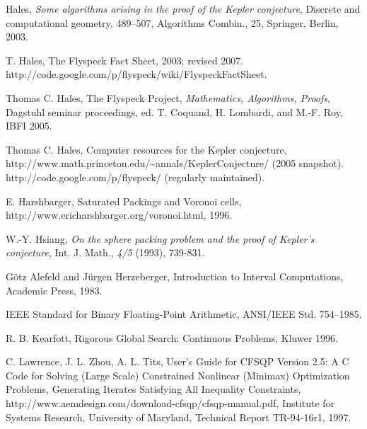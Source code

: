\documentclass{article} %
\begin{document}
\begin{thebibliography}{HeHa94}
 Hales, {\it Some algorithms arising in the proof of the
	Kepler conjecture}, 
	Discrete and computational
geometry, 489--507, Algorithms Combin., 25, Springer, Berlin,
2003.
	
	   T. Hales, The Flyspeck Fact Sheet, 2003; revised
2007. http://code.google.com/p/flyspeck/wiki/FlyspeckFactSheet.
	
	  Thomas C. Hales, The Flyspeck Project, 
{\it Mathematics, Algorithms, Proofs}, Dagstuhl seminar proceedings, 
ed. T. Coquand, H. Lombardi, and M.-F. Roy,
IBFI 2005.
	






 Thomas C. Hales, Computer resources for the Kepler conjecture, \hfill\break
    http://www.math.princeton.edu/\~\!annals/KeplerConjecture/ (2005 snapshot).
    http://code.google.com/p/flyspeck/ (regularly maintained).
    
 E. Harshbarger, Saturated Packings and Voronoi cells, http://www.ericharshbarger.org/voronoi.html, 1996.

 W.-Y. Hsiang, {\it On the sphere packing problem and
the proof of Kepler's conjecture}, Int. J. Math., \emph{4/5} (1993),
739-831.

 G\"otz Alefeld and J\"urgen Herzeberger,
Introduction to Interval Computations, Academic Press, 1983.


 IEEE Standard for Binary Floating-Point Arithmetic,
ANSI/IEEE Std. 754--1985.

 R. B. Kearfott, Rigorous Global Search: Continuous
Problems, Kluwer 1996.

 C. Lawrence, J. L. Zhou, A. L. Tits,  User's Guide for CFSQP Version 2.5:
   A C Code for Solving (Large Scale) Constrained Nonlinear (Minimax) Optimization Problems, Generating
   Iterates Satisfying All Inequality Constraints, 
   http://www.aemdesign.com/download-cfsqp/cfsqp-manual.pdf, 
   Institute for Systems Research, University of Maryland, Technical Report TR-94-16r1, 1997.



\end{thebibliography}
\end{document}
